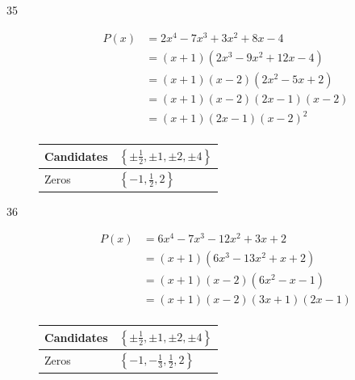 \documentclass{exam}
\begin{document}
\begin{description}
        \vspace{.5 cm}

    \pagebreak

      \item[35]
        \begin{align*}
          P(x) &= 2x^4 - 7x^3 + 3x^2 + 8x - 4 \\
               &= (x + 1)(2x^3 - 9x^2 +12x - 4) \\
               &= (x + 1)(x - 2)(2x^2 - 5x + 2) \\
               &= (x + 1)(x - 2)(2x - 1)(x - 2) \\
               &= (x + 1)(2x - 1)(x - 2)^2 \\
        \end{align*}

        \begin{tabular}{ll}
          \toprule
          Candidates & $\left\{ \pm \frac{1}{2}, \pm 1, \pm 2, \pm 4 \right\}$ \\
          \midrule
          Zeros      & $\left\{ -1, \frac{1}{2}, 2 \right\}$ \\
          \bottomrule
        \end{tabular}

        \vspace{.5 cm}

      \item[36]
        \begin{align*}
          P(x) &= 6x^4 - 7x^3 - 12x^2 + 3x + 2 \\
               &= (x + 1)(6x^3 - 13x^2 + x + 2) \\
               &= (x + 1)(x - 2)(6x^2 - x - 1) \\
               &= (x + 1)(x - 2)(3x + 1)(2x - 1) \\
        \end{align*}

        \begin{tabular}{ll}
          \toprule
          Candidates & $\left\{ \pm \frac{1}{2}, \pm 1, \pm 2, \pm 4 \right\}$ \\
          \midrule
          Zeros      & $\left\{ -1, - \frac{1}{3}, \frac{1}{2}, 2 \right\}$ \\
          \bottomrule
        \end{tabular}

        \vspace{.5 cm}

    \pagebreak


\end{description}
\end{document}

